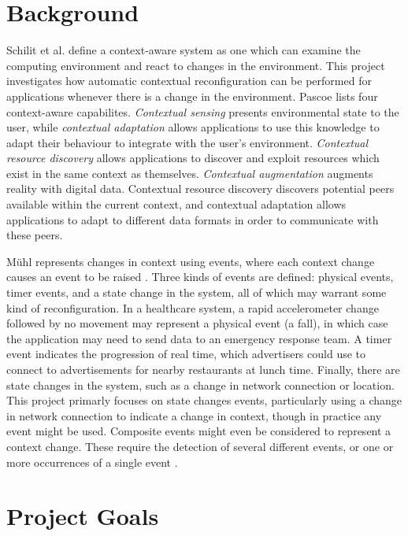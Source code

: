 \documentclass[12pt,twoside,notitlepage]{report}
\begin{document}
\section{Background}

Schilit et al. \cite{schilit1994context}  define a context-aware system as one which can examine the computing environment and react to changes in the environment. 
This project investigates how automatic contextual reconfiguration can be performed for applications whenever there is a change in the environment. 
Pascoe \cite{pascoe1998adding} lists four context-aware capabilites. 
{\sl Contextual sensing} presents environmental state to the user, while {\sl contextual adaptation} allows applications to use this knowledge to adapt their behaviour to integrate with the user's environment.
{\sl Contextual resource discovery} allows applications to discover and exploit resources which exist in the same context as themselves. 
{\sl Contextual augmentation} augments reality with digital data. 
Contextual resource discovery discovers potential peers available within the current context, and contextual adaptation allows applications to adapt to different data formats in order to communicate with these peers. 


M\"{u}hl represents changes in context using events, where each context change causes an event to be raised \cite[p11]{muhl2006distributed}.
Three kinds of events are defined: physical events, timer events, and a state change in the system, all of which may warrant some kind of reconfiguration. 
In a healthcare system, a rapid accelerometer change followed by no movement may represent a physical event (a fall), in which case the application may need to send data to an emergency response team.
A timer event indicates the progression of real time, which advertisers could use to connect to advertisements for nearby restaurants at lunch time. 
Finally, there are state changes in the system, such as a change in network connection or location. 
This project primarly focuses on state changes events, particularly using a change in network connection to indicate a change in context, though in practice any event might be used.  
Composite events might even be considered to represent a context change. 
These require the detection of several different events, or one or more occurrences of a single event \cite{chakravarthy1994composite}. 

\section{Project Goals}
\end{document}

